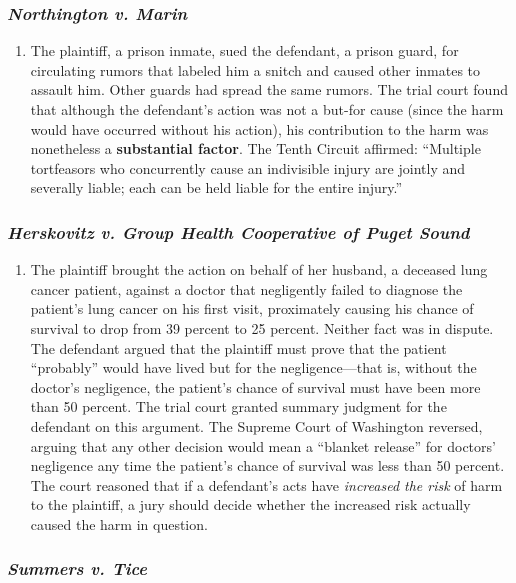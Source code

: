 \subsubsection{\emph{Northington v. Marin}}

\begin{enumerate}
    \item The plaintiff, a prison inmate, sued the defendant, a prison guard, for circulating rumors that labeled him a snitch and caused other inmates to assault him. Other guards had spread the same rumors. The trial court found that although the defendant's action was not a but-for cause (since the harm would have occurred without his action), his contribution to the harm was nonetheless a \textbf{substantial factor}. The Tenth Circuit affirmed: ``Multiple tortfeasors who concurrently cause an indivisible injury are jointly and severally liable; each can be held liable for the entire injury.''
\end{enumerate}

\subsubsection{\emph{Herskovitz v. Group Health Cooperative of Puget Sound}}

\begin{enumerate}
    \item The plaintiff brought the action on behalf of her husband, a deceased lung cancer patient, against a doctor that negligently failed to diagnose the patient's lung cancer on his first visit, proximately causing his chance of survival to drop from 39 percent to 25 percent. Neither fact was in dispute. The defendant argued that the plaintiff must prove that the patient ``probably'' would have lived but for the negligence---that is, without the doctor's negligence, the patient's chance of survival must have been more than 50 percent. The trial court granted summary judgment for the defendant on this argument. The Supreme Court of Washington reversed, arguing that any other decision would mean a ``blanket release'' for doctors' negligence any time the patient's chance of survival was less than 50 percent. The court reasoned that if a defendant's acts have \emph{increased the risk} of harm to the plaintiff, a jury should decide whether the increased risk actually caused the harm in question.
\end{enumerate}

\subsubsection{\emph{Summers v. Tice}}

